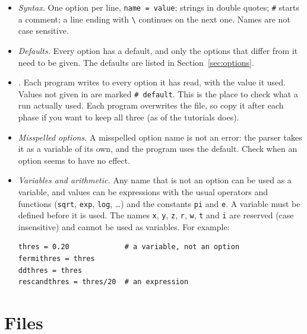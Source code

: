 \begin{itemize}
\item \emph{Syntax.} One option per line, \texttt{name = value}; strings in
  double quotes; \texttt{\#} starts a comment; a line ending with
  \texttt{\textbackslash} continues on the next one. Names are not case
  sensitive.
\item \emph{Defaults.} Every option has a default, and only the options
  that differ from it need to be given. The defaults are listed in
  Section~\ref{sec:options}.
\item \emph{.} Each program writes to  every
  option it has read, with the value it used. Values not given in
   are marked \texttt{\# default}. This is the place to check
  what a run actually used. Each program overwrites the file, so copy it
  after each phase if you want to keep all three (as  of the
  tutorials does).
\item \emph{Misspelled options.} A misspelled option name is not an error:
  the parser takes it as a variable of its own, and the program uses the
  default. Check  when an option seems to have no effect.
\item \emph{Variables and arithmetic.} Any name that is not an option can
  be used as a variable, and values can be expressions with the usual
  operators and functions (\texttt{sqrt}, \texttt{exp}, \texttt{log},
  \ldots) and the constants \texttt{pi} and \texttt{e}. A variable must be
  defined before it is used. The names \texttt{x}, \texttt{y}, \texttt{z},
  \texttt{r}, \texttt{w}, \texttt{t} and \texttt{i} are reserved (case
  insensitive) and cannot be used as variables. For example:
\begin{lstlisting}
thres = 0.20             # a variable, not an option
fermithres = thres
ddthres = thres
rescandthres = thres/20  # an expression
\end{lstlisting}
\end{itemize}

\section{Files}\label{sec:files-in}

